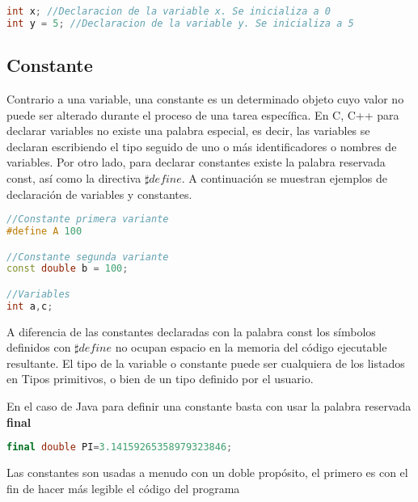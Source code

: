 \begin{lstlisting}[language=C++]
int x; //Declaracion de la variable x. Se inicializa a 0
int y = 5; //Declaracion de la variable y. Se inicializa a 5
\end{lstlisting} 

\subsection{Constante}

Contrario a una variable, una constante es un determinado objeto
cuyo valor no puede ser alterado durante el proceso de una tarea específica. En C, C++ para declarar
variables no existe una palabra especial, es decir, las variables se declaran escribiendo el tipo seguido
de uno o más identificadores o nombres de variables. Por otro lado, para declarar constantes existe
la palabra reservada const, así como la directiva $\sharp define$. A continuación se muestran ejemplos de declaración de variables y constantes.

\begin{lstlisting}[language=C++]
//Constante primera variante
#define A 100

//Constante segunda variante
const double b = 100;

//Variables 
int a,c;
\end{lstlisting}

A diferencia de las constantes declaradas con la palabra const los símbolos definidos con $\sharp define$ no
ocupan espacio en la memoria del código ejecutable resultante.
El tipo de la variable o constante puede ser cualquiera de los listados en Tipos primitivos, o bien de
 un tipo definido por el usuario.

En el caso de Java para definir una constante basta con usar la palabra reservada \textbf{final}

\begin{lstlisting}[language=C++]
final double PI=3.14159265358979323846;
\end{lstlisting}

Las constantes son usadas a menudo con un doble propósito, el primero es con el fin de hacer más
 legible el código del programa
